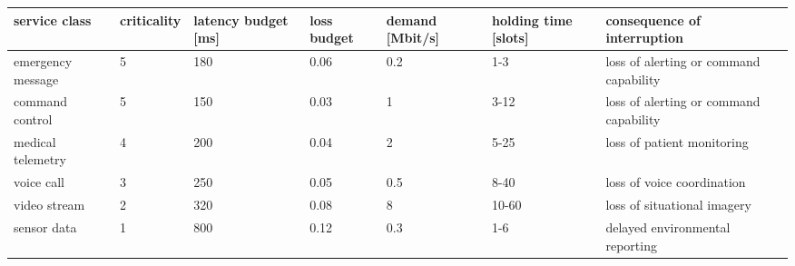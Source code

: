 \begin{tabular}{lllllll}
\toprule
service class & criticality & latency budget [ms] & loss budget & demand [Mbit/s] & holding time [slots] & consequence of interruption \\
\midrule
emergency message & 5 & 180 & 0.06 & 0.2 & 1-3 & loss of alerting or command capability \\
command control & 5 & 150 & 0.03 & 1 & 3-12 & loss of alerting or command capability \\
medical telemetry & 4 & 200 & 0.04 & 2 & 5-25 & loss of patient monitoring \\
voice call & 3 & 250 & 0.05 & 0.5 & 8-40 & loss of voice coordination \\
video stream & 2 & 320 & 0.08 & 8 & 10-60 & loss of situational imagery \\
sensor data & 1 & 800 & 0.12 & 0.3 & 1-6 & delayed environmental reporting \\
\bottomrule
\end{tabular}
